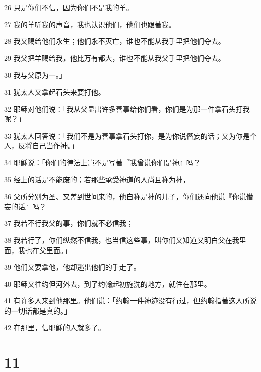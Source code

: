 \par 26 只是你们不信，因为你们不是我的羊。
\par 27 我的羊听我的声音，我也认识他们，他们也跟著我。
\par 28 我又赐给他们永生；他们永不灭亡，谁也不能从我手里把他们夺去。
\par 29 我父把羊赐给我，他比万有都大，谁也不能从我父手里把他们夺去。
\par 30 我与父原为一。」
\par 31 犹太人又拿起石头来要打他。
\par 32 耶稣对他们说：「我从父显出许多善事给你们看，你们是为那一件拿石头打我呢？」
\par 33 犹太人回答说：「我们不是为善事拿石头打你，是为你说僭妄的话；又为你是个人，反将自己当作神。」
\par 34 耶稣说：「你们的律法上岂不是写著『我曾说你们是神』吗？
\par 35 经上的话是不能废的；若那些承受神道的人尚且称为神，
\par 36 父所分别为圣、又差到世间来的，他自称是神的儿子，你们还向他说『你说僭妄的话』吗？
\par 37 我若不行我父的事，你们就不必信我；
\par 38 我若行了，你们纵然不信我，也当信这些事，叫你们又知道又明白父在我里面，我也在父里面。」
\par 39 他们又要拿他，他却逃出他们的手走了。
\par 40 耶稣又往约但河外去，到了约翰起初施洗的地方，就住在那里。
\par 41 有许多人来到他那里。他们说：「约翰一件神迹没有行过，但约翰指著这人所说的一切话都是真的。」
\par 42 在那里，信耶稣的人就多了。

\chapter{11}

